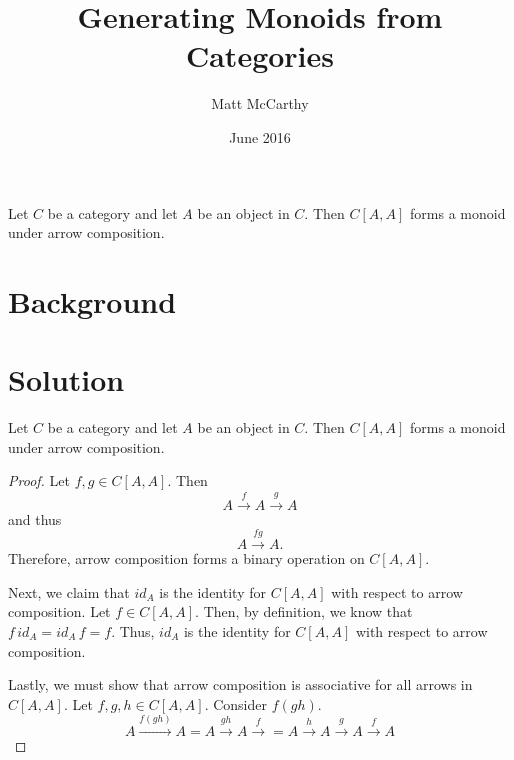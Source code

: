 \documentclass[notitlepage]{problem-solving}
\author{Matt McCarthy}
\date{June 2016}
\title{Generating Monoids from Categories}
\begin{document}
\maketitle

\begin{thm*}
	Let $C$ be a category and let $A$ be an object in $C$.
	Then $C[A,A]$ forms a monoid under arrow composition.
\end{thm*}

\section{Background}

\section{Solution}

\begin{thm}
	Let $C$ be a category and let $A$ be an object in $C$.
	Then $C[A,A]$ forms a monoid under arrow composition.
\end{thm}
\begin{proof}
	Let $f,g\in C[A,A]$.
	Then
	\[
		A \xrightarrow{f} A \xrightarrow{g} A
	\]
	and thus
	\[
		A \xrightarrow{fg} A.
	\]
	Therefore, arrow composition forms a binary operation on $C[A,A]$.

	Next, we claim that $id_A$ is the identity for $C[A,A]$ with respect to arrow composition.
	Let $f\in C[A,A]$.
	Then, by definition, we know that $f\, id_A = id_A\, f = f$.
	Thus, $id_A$ is the identity for $C[A,A]$ with respect to arrow composition.

	Lastly, we must show that arrow composition is associative for all arrows in $C[A,A]$.
	Let $f,g,h\in C[A,A]$.
	Consider $f(gh)$.
	\[
		A \xrightarrow{f(gh)} A = A\xrightarrow{gh} A \xrightarrow{f} = A\xrightarrow{h} A\xrightarrow{g} A\xrightarrow{f} A
	\]
\end{proof}
\end{document}
